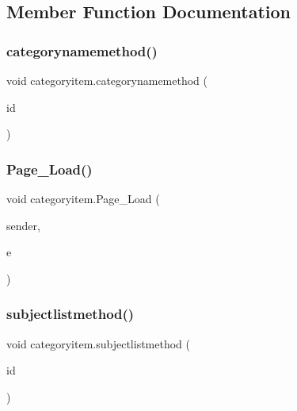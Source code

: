 \subsection{Member Function Documentation}
\mbox{\label{classcategoryitem_a373048404961df6116c7e9608fafebac}} 
\subsubsection{\texorpdfstring{categorynamemethod()}{categorynamemethod()}}
{\footnotesize\ttfamily void categoryitem.\+categorynamemethod (\begin{DoxyParamCaption}\item[{int}]{id }\end{DoxyParamCaption})}

\mbox{\label{classcategoryitem_aa3296de18f1a812c2dda991dd40118b1}} 
\subsubsection{\texorpdfstring{Page\_Load()}{Page\_Load()}}
{\footnotesize\ttfamily void categoryitem.\+Page\+\_\+\+Load (\begin{DoxyParamCaption}\item[{object}]{sender,  }\item[{Event\+Args}]{e }\end{DoxyParamCaption})\hspace{0.3cm}{\ttfamily [protected]}}

\mbox{\label{classcategoryitem_a9df534c2b7cea7fabd2f73e82c2e9d96}} 
\subsubsection{\texorpdfstring{subjectlistmethod()}{subjectlistmethod()}}
{\footnotesize\ttfamily void categoryitem.\+subjectlistmethod (\begin{DoxyParamCaption}\item[{int}]{id }\end{DoxyParamCaption})}



